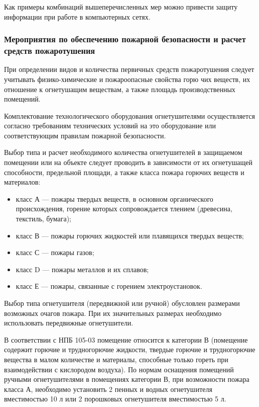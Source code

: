 Как примеры комбинаций вышеперечисленных мер можно привести защиту информации при работе в компьютерных сетях.

\subsubsection{Мероприятия по обеспечению пожарной безопасности и расчет средств пожаротушения}

При определении видов и количества первичных средств пожаротушения следует учитывать физико-химические и пожароопасные свойства горю чих веществ, их отношение к огнетушащим веществам, а также площадь производственных помещений.

Комплектование технологического оборудования огнетушителями осуществляется согласно требованиям технических условий на это оборудование или соответствующим правилам пожарной безопасности.

Выбор типа и расчет необходимого количества огнетушителей в защищаемом помещении или на объекте следует проводить в зависимости от их огнетушащей способности, предельной площади, а также класса пожара горючих веществ и материалов:
\begin{itemize}
  \item класс А --- пожары твердых веществ, в основном органического происхождения, горение которых сопровождается тлением (древесина, текстиль, бумага);
  \item класс В --- пожары горючих жидкостей или плавящихся твердых веществ;
  \item класс С --- пожары газов;
  \item класс D --- пожары металлов и их сплавов;
  \item класс Е --- пожары, связанные с горением электроустановок.
\end{itemize}

Выбор типа огнетушителя (передвижной или ручной) обусловлен размерами возможных очагов пожара.
При их значительных размерах необходимо использовать передвижные огнетушители.

В соответствии с НПБ 105-03 помещение относится к категории В (помещение содержит горючие и трудногорючие жидкости, твердые горючие и трудногорючие вещества в малом количестве и материалы, способные только гореть при взаимодействии с кислородом воздуха).
По нормам оснащения помещений ручными огнетушителями в помещениях категории В, при возможности пожара класса А, необходимо установить 2 пенных и водных огнетушителя вместимостью 10 л или 2 порошковых огнетушителя вместимостью 5 л.

